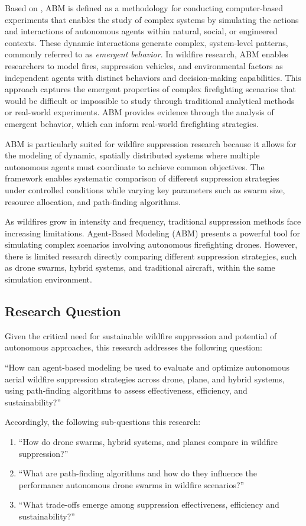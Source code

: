 \documentclass[11pt, a4paper]{article}
\begin{document}
Based on \citet{wilensky2015introduction}, ABM is defined as a methodology for conducting computer-based experiments that enables the study of complex systems by simulating the actions and interactions of autonomous agents within natural, social, or engineered contexts. These dynamic interactions generate complex, system-level patterns, commonly referred to as \textit{emergent behavior}. In wildfire research, ABM enables researchers to model fires, suppression vehicles, and environmental factors as independent agents with distinct behaviors and decision-making capabilities. This approach captures the emergent properties of complex firefighting scenarios that would be difficult or impossible to study through traditional analytical methods or real-world experiments. ABM provides evidence through the analysis of emergent behavior, which can inform real-world firefighting strategies.

ABM is particularly suited for wildfire suppression research because it allows for the modeling of dynamic, spatially distributed systems where multiple autonomous agents must coordinate to achieve common objectives. The framework enables systematic comparison of different suppression strategies under controlled conditions while varying key parameters such as swarm size, resource allocation, and path-finding algorithms.

As wildfires grow in intensity and frequency, traditional suppression methods face increasing limitations. Agent-Based Modeling (ABM) presents a powerful tool for simulating complex scenarios involving autonomous firefighting drones. However, there is limited research directly comparing different suppression strategies, such as drone swarms, hybrid systems, and traditional aircraft, within the same simulation environment.

\subsection{Research Question}
Given the critical need for sustainable wildfire suppression and potential of autonomous approaches, this research addresses the following question:

\indent``How can agent-based modeling be used to evaluate and optimize autonomous aerial wildfire suppression strategies across drone, plane, and hybrid systems, using path-finding algorithms to assess effectiveness, efficiency, and sustainability?''

Accordingly, the following sub-questions this research:
\begin{enumerate}
  \item ``How do drone swarms, hybrid systems, and planes compare in wildfire suppression?''
  \item ``What are path-finding algorithms and how do they influence the performance autonomous drone swarms in wildfire scenarios?''
  \item ``What trade-offs emerge among suppression effectiveness, efficiency and sustainability?''
\end{enumerate}
\end{document}
